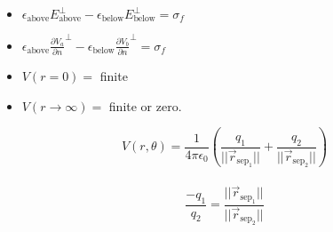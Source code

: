 \documentclass{article}
\newcommand{\kfrac}{\frac{1}{4\pi\epsilon_0}}
\newcommand{\doubleformula}[3]{\begin{center} \begin{tcolorbox}[title = #1, boxrule=2pt,arc=3.4pt,boxsep=0mm] $$#2$$\\$$#3$$\end{tcolorbox}\end{center}}
\begin{document}
\begin{multicols}{2}
{\begin{itemize}
                \item $\epsilon_\textrm{above}E_\textrm{above}^\perp - \epsilon_\textrm{below}E_\textrm{below}^\perp = \sigma_f$
                \item $\epsilon_\textrm{above}\frac{\partial V_a}{\partial n}^\perp - \epsilon_\textrm{below}\frac{\partial V_b}{\partial n}^\perp = \sigma_f$
                \item $V(r = 0) = $ finite
                \item $V(r \to \infty) = $ finite or zero.
            \end{itemize}
        }
        \doubleformula{Method of Images Voltage}{V(r, \theta) = \kfrac \left(\frac{q_1}{||\vec{r}_{\textrm{sep}_1}||} + \frac{q_2}{||\vec{r}_{\textrm{sep}_2}||}\right)}{\frac{-q_1}{q_2} = \frac{||\vec{r}_{\textrm{sep}_1}||}{||\vec{r}_{\textrm{sep}_2}||}}
        
    \end{multicols}
\end{document}
